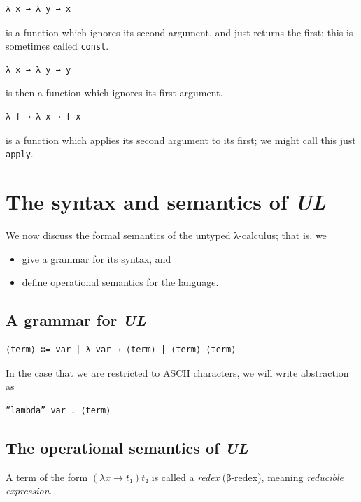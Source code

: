 \documentclass[11pt]{article}
\theoremstyle{definition}
\begin{document}
\begin{verbatim}
λ x → λ y → x
\end{verbatim}
is a function which ignores its second argument,
and just returns the first; this is sometimes called \texttt{const}.

\begin{verbatim}
λ x → λ y → y
\end{verbatim}
is then a function which ignores its first argument.

\begin{verbatim}
λ f → λ x → f x
\end{verbatim}
is a function which applies its second argument to its first;
we might call this just \texttt{apply}.

\section{The syntax and semantics of \emph{UL}}
\label{sec:org3e03b0e}
We now discuss the formal semantics of the untyped λ-calculus;
that is, we
\begin{itemize}
\item give a grammar for its syntax, and
\item define operational semantics for the language.
\end{itemize}

\subsection{A grammar for \emph{UL}}
\label{sec:orge19706f}
\begin{verbatim}
⟨term⟩ ∷= var | λ var → ⟨term⟩ | ⟨term⟩ ⟨term⟩
\end{verbatim}

In the case that we are restricted to ASCII characters,
we will write abstraction as
\begin{verbatim}
“lambda” var . ⟨term⟩
\end{verbatim}

\subsection{The operational semantics of \emph{UL}}
\label{sec:orgb166ecd}
A term of the form \((λ x → t₁) t₂\) is called a \emph{redex} (β-redex),
meaning \emph{reducible expression}.
\end{document}
